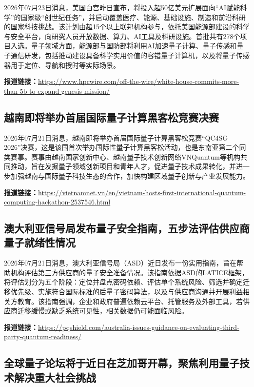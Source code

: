 \documentclass[12pt,a4paper]{ctexart}
\begin{document}
2026年07月23日消息，美国白宫昨日宣布，将投入超50亿美元扩展面向“AI赋能科学”的国家级“创世纪任务”，并启动覆盖医疗、能源、基础设施、制造和前沿科研的国家科技挑战。该计划由超15个以上联邦机构参与，依托美国能源部建设的科学与安全平台，向研究人员开放数据、算力、AI工具及科研设施。首批共有278个项目入选。量子领域方面，能源部与国防部将利用AI加速量子计算、量子传感和量子通信研发，包括推动建设具备科学实用价值的容错量子计算机，以及将量子传感器用于定位、导航和授时等实际场景。

\noindent\textbf{报道链接：}\url{https://www.hpcwire.com/off-the-wire/white-house-commits-more-than-5b-to-expand-genesis-mission/}

\subsection{ 越南即将举办首届国际量子计算黑客松竞赛决赛 }

2026年07月21日消息，越南即将举办首届国际量子计算黑客松竞赛“QC4SG 2026”决赛，这是该国首次举办国际性量子计算黑客松活动，也是东南亚第二个同类赛事。赛事由越南国家创新中心、越南量子技术创新网络VNQuantum等机构共同推动，旨在发掘量子领域创新项目和青年人才，促进量子技术成果转化，并进一步加强越南与国际量子科技生态的合作，加快构建区域量子创新与产业发展能力。

\noindent\textbf{报道链接：}\url{https://vietnamnet.vn/en/vietnam-hosts-first-international-quantum-computing-hackathon-2537546.html}

\subsection{ 澳大利亚信号局发布量子安全指南，五步法评估供应商量子就绪性情况 }

2026年07月21日消息，澳大利亚信号局（ASD）近日发布一份实用指南，旨在帮助机构评估第三方供应商的量子安全准备情况。该指南依据ASD的LATICE框架，将评估划分为五个阶段：定位并盘点密码依赖、评估单个系统风险、筛选并确定迁移优先级、实施符合国际标准的后量子密码算法，以及与供应商沟通并开展利益相关方教育。该指南强调，企业和政府普遍依赖云平台、托管服务及外部工具，若供应商迁移缓慢或缺乏系统可见性，相关数据仍可能面临风险。

\noindent\textbf{报道链接：}\url{https://pqshield.com/australia-issues-guidance-on-evaluating-third-party-quantum-readiness/}

\subsection{ 全球量子论坛将于近日在芝加哥开幕，聚焦利用量子技术解决重大社会挑战 }
\end{document}
